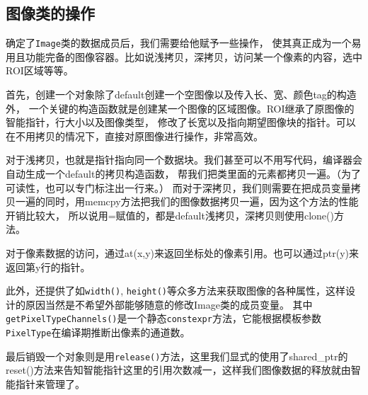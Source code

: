 \documentclass[11pt]{article}
\begin{document}
\subsection{图像类的操作}
确定了\texttt{Image}类的数据成员后，我们需要给他赋予一些操作，
使其真正成为一个易用且功能完备的图像容器。比如说浅拷贝，深拷贝，访问某一个像素的内容，选中ROI区域等等。


首先，创建一个对象除了default创建一个空图像以及传入长、宽、颜色tag的构造外，
一个关键的构造函数就是创建某一个图像的区域图像。ROI继承了原图像的智能指针，行大小以及图像类型，
修改了长宽以及指向期望图像块的指针。可以在不用拷贝的情况下，直接对原图像进行操作，非常高效。


对于浅拷贝，也就是指针指向同一个数据块。我们甚至可以不用写代码，编译器会自动生成一个default的拷贝构造函数，
帮我们把类里面的元素都拷贝一遍。（为了可读性，也可以专门标注出一行来。）
而对于深拷贝，我们则需要在把成员变量拷贝一遍的同时，用memcpy方法把我们的图像数据拷贝一遍，因为这个方法的性能开销比较大，
所以说用=赋值的，都是default浅拷贝，深拷贝则使用clone()方法。


对于像素数据的访问，通过at(x,y)来返回坐标处的像素引用。也可以通过ptr(y)来返回第y行的指针。


此外，还提供了如\texttt{width()}, \texttt{height()}等众多方法来获取图像的各种属性，这样设计的原因当然是不希望外部能够随意的修改Image类的成员变量。
 其中\texttt{getPixelTypeChannels()}是一个静态\texttt{constexpr}方法，它能根据模板参数\texttt{PixelType}在编译期推断出像素的通道数。


最后销毁一个对象则是用\texttt{release()}方法，这里我们显式的使用了shared\_ptr的reset()方法来告知智能指针这里的引用次数减一，这样我们图像数据的释放就由智能指针来管理了。
\end{document}
